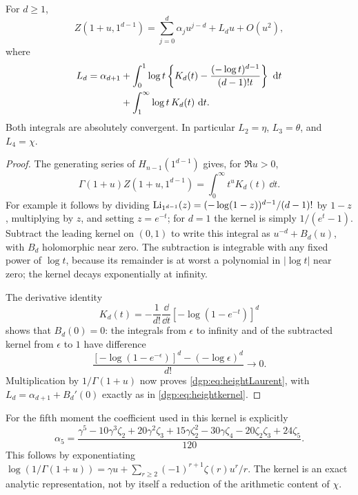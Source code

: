 \begin{proposition}
\label{dgp:prop:heightkernel}
For $d\ge1$,
\begin{equation}
 Z(1+u,1^{d-1})=\sum_{j=0}^d \alpha_ju^{j-d}+L_du+O(u^2),
 \label{dgp:eq:heightLaurent}
\end{equation}
where
\begin{align}
 L_d=\alpha_{d+1}
 &+\int_0^1\log t\left\{K_d(t)
                  -\frac{(-\log t)^{d-1}}{(d-1)!t}\right\}\,\,\mathrm d t
 \notag\\
 &+\int_1^\infty\log t\,K_d(t)\,\,\mathrm d t.
 \label{dgp:eq:heightkernel}
\end{align}
Both integrals are absolutely convergent.  In particular
$L_2=\eta$, $L_3=\theta$, and $L_4=\chi$.
\end{proposition}

\begin{proof}
The generating series of $H_{n-1}(1^{d-1})$ gives, for $\Re u>0$,
\[
 \Gamma(1+u)Z(1+u,1^{d-1})=\int_0^\infty t^uK_d(t)\,\dd t.
\]
For example it follows by dividing
$\operatorname{Li}_{1^{d-1}}(z)=(-\log(1-z))^{d-1}/(d-1)!$
by $1-z$, multiplying by $z$, and setting $z=e^{-t}$; for $d=1$
the kernel is simply $1/(e^t-1)$.  Subtract the leading kernel on
$(0,1)$ to write this integral as $u^{-d}+B_d(u)$, with $B_d$
holomorphic near zero.  The subtraction is integrable with any fixed
power of $\log t$, because its remainder is at worst a polynomial in
$|\log t|$ near zero; the kernel decays exponentially at infinity.

The derivative identity
\[
 K_d(t)=-\frac1{d!}\frac{\dd}{\dd t}
                         [-\log(1-e^{-t})]^d
\]
shows that $B_d(0)=0$: the integrals from $\epsilon$ to infinity
and of the subtracted kernel from $\epsilon$ to $1$ have difference
\[
 \frac{[-\log(1-e^{-\epsilon})]^d-(-\log\epsilon)^d}{d!}
                         \longrightarrow0.
\]
Multiplication by $1/\Gamma(1+u)$ now proves
\eqref{dgp:eq:heightLaurent}, with $L_d=\alpha_{d+1}+B_d'(0)$ exactly as
in \eqref{dgp:eq:heightkernel}.
\end{proof}

For the fifth moment the coefficient used in this kernel is explicitly
\begin{equation}
 \alpha_5=\frac{\gamma^5-10\gamma^3\zeta_2+20\gamma^2\zeta_3
       +15\gamma\zeta_2^2-30\gamma\zeta_4
       -20\zeta_2\zeta_3+24\zeta_5}{120}.
 \label{dgp:eq:a5}
\end{equation}
This follows by exponentiating
$\log(1/\Gamma(1+u))=\gamma u+
\sum_{r\ge2}(-1)^{r+1}\zeta(r)u^r/r$.
The kernel is an exact analytic representation, not by itself a
reduction of the arithmetic content of $\chi$.


